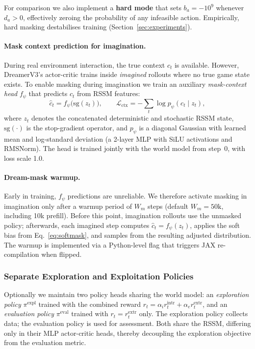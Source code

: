 \documentclass{article}
\begin{document}
For comparison we also implement a \textbf{hard mode} that sets
$b_a = -10^9$ whenever $d_a>0$, effectively zeroing the probability
of any infeasible action.  Empirically, hard masking destabilises
training (Section~\ref{sec:experiments}).

\paragraph{Mask context prediction for imagination.}
During real environment interaction, the true context $c_t$ is
available.  However, DreamerV3's actor-critic trains inside
\emph{imagined} rollouts where no true game state exists.  To enable
masking during imagination we train an auxiliary
\emph{mask-context head} $f_\psi$ that predicts $c_t$ from RSSM
features:
\begin{equation}
  \hat{c}_t = f_\psi\!\bigl(\mathrm{sg}(z_t)\bigr),
  \qquad
  \mathcal{L}_{\mathrm{ctx}}
  =
  -\!\sum_{t}\log p_\psi(c_t \mid z_t),
  \label{eq:ctx_head}
\end{equation}
where $z_t$ denotes the concatenated deterministic and stochastic RSSM
state, $\mathrm{sg}(\cdot)$ is the stop-gradient operator, and
$p_\psi$ is a diagonal Gaussian with learned mean and log-standard
deviation (a 2-layer MLP with SiLU activations and RMSNorm).
The head is trained jointly with the world model from step~0,
with loss scale 1.0.

\paragraph{Dream-mask warmup.}
Early in training, $f_\psi$ predictions are unreliable.  We therefore
activate masking in imagination only after a warmup period of $W_m$
steps (default $W_m\!=\!50\text{k}$, including 10k prefill).
Before this point, imagination rollouts use the unmasked policy;
afterwards, each imagined step computes
$\hat{c}_t=f_\psi(z_t)$, applies the soft bias from
Eq.~\eqref{eq:softmask}, and samples from the resulting adjusted
distribution.  The warmup is implemented via a Python-level flag that
triggers JAX re-compilation when flipped.

\subsubsection{Separate Exploration and Exploitation Policies}
\label{sec:sep_policies}

Optionally we maintain two policy heads sharing the world model:
an \emph{exploration policy} $\pi^{\mathrm{expl}}$ trained with
the combined reward
$r_t=\alpha_i r_t^{\mathrm{intr}}+\alpha_e r_t^{\mathrm{extr}}$,
and an \emph{evaluation policy} $\pi^{\mathrm{eval}}$ trained with
$r_t=r_t^{\mathrm{extr}}$ only.  The exploration policy collects
data; the evaluation policy is used for assessment.  Both share the
RSSM, differing only in their MLP actor-critic heads, thereby
decoupling the exploration objective from the evaluation metric.
\end{document}
